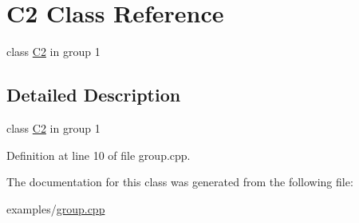 \hypertarget{class_c2}{}\section{C2 Class Reference}
\label{class_c2}


class \hyperlink{class_c2}{C2} in group 1  




\subsection{Detailed Description}
class \hyperlink{class_c2}{C2} in group 1 

Definition at line 10 of file group.\+cpp.



The documentation for this class was generated from the following file\+:\begin{DoxyCompactItemize}
\item 
examples/\hyperlink{group_8cpp}{group.\+cpp}\end{DoxyCompactItemize}
